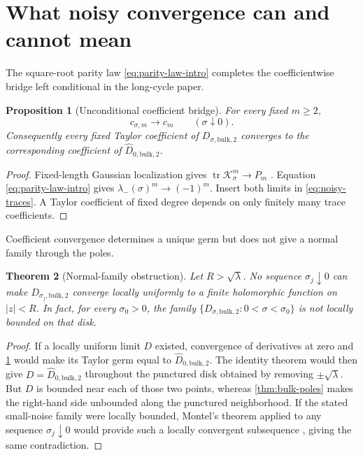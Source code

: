 \documentclass[11pt]{article}
\newtheorem{theorem}{Theorem}[section]
\newtheorem{proposition}[theorem]{Proposition}
\theoremstyle{definition}
\theoremstyle{remark}
\newcommand{\cK}{\mathcal K}
\begin{document}
\section{What noisy convergence can and cannot mean}
\label{sec:noisy-obstruction}

The square-root parity law \eqref{eq:parity-law-intro} completes the
coefficientwise bridge left conditional in the long-cycle paper.

\begin{proposition}[Unconditional coefficient bridge]
\label{prop:coefficient-bridge}
For every fixed $m\ge2$,
\begin{equation}\label{eq:coefficient-bridge}
 c_{\sigma,m}\longrightarrow c_m
 \qquad(\sigma\downarrow0).
\end{equation}
Consequently every fixed Taylor coefficient of
$D_{\sigma,\mathrm{bulk},2}$ converges to the corresponding coefficient of
$\widehat D_{0,\mathrm{bulk},2}$.
\end{proposition}

\begin{proof}
Fixed-length Gaussian localization gives
$\operatorname{tr}\cK_\sigma^m\to P_m$
\citep{WangLongCycle2026}.  Equation \eqref{eq:parity-law-intro} gives
$\lambda_-(\sigma)^m\to(-1)^m$.  Insert both limits in
\eqref{eq:noisy-traces}.  A Taylor coefficient of fixed degree depends on
only finitely many trace coefficients.
\end{proof}

Coefficient convergence determines a unique germ but does not give a normal
family through the poles.

\begin{theorem}[Normal-family obstruction]
\label{thm:normal-obstruction}
Let $R>\sqrt\lambda$.  No sequence $\sigma_j\downarrow0$ can make
$D_{\sigma_j,\mathrm{bulk},2}$ converge locally uniformly to a finite
holomorphic function on $|z|<R$.  In fact, for every $\sigma_0>0$, the family
$\{D_{\sigma,\mathrm{bulk},2}:0<\sigma<\sigma_0\}$ is not locally bounded on
that disk.
\end{theorem}

\begin{proof}
If a locally uniform limit $D$ existed, convergence of derivatives at zero
and \cref{prop:coefficient-bridge} would make its Taylor germ equal to
$\widehat D_{0,\mathrm{bulk},2}$.  The identity theorem would then give
$D=\widehat D_{0,\mathrm{bulk},2}$ throughout the punctured disk obtained by
removing $\pm\sqrt\lambda$.  But $D$ is bounded near each of those two points,
whereas \cref{thm:bulk-poles} makes the right-hand side unbounded along the
punctured neighborhood.  If the stated small-noise family were locally
bounded, Montel's theorem applied to any sequence $\sigma_j\downarrow0$ would
provide such a locally convergent subsequence \citep{Conway1978}, giving the
same contradiction.
\end{proof}
\end{document}
